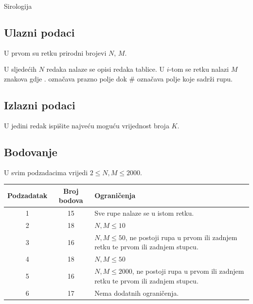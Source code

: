 \begin{statement}[
  problempoints=100,
  timelimit=1 sekunda,
  memorylimit=1024 MiB,
]{Sirologija}
\begin{figure}[!h]
\begin{subfigure}{0.49\linewidth}
    \end{subfigure}

  \end{figure}

\subsection*{Ulazni podaci}

U prvom su retku prirodni brojevi $N$, $M$.

U sljedećih $N$ redaka nalaze se opisi redaka tablice. U $i$-tom se retku nalazi $M$ znakova gdje $\texttt{.}$ označava prazno polje dok $\texttt{\#}$ označava polje koje sadrži rupu. 

\subsection*{Izlazni podaci}

U jedini redak ispišite najveću moguću vrijednost broja $K$.

\subsection*{Bodovanje}

U svim podzadacima vrijedi $2 \leq N, M \leq 2000$.

{\renewcommand{\arraystretch}{1.4}
  \setlength{\tabcolsep}{6pt}
  \begin{tabular}{ccl}
   Podzadatak & Broj bodova & Ograničenja \\ \midrule
    1 & 15 & Sve rupe nalaze se u istom retku. \\
    2 & 18 & $N, M \leq 10$ \\
    3 & 16 & $N, M \leq 50$, ne postoji rupa u prvom ili zadnjem retku te prvom ili zadnjem stupcu.\\
    4 & 18 & $N, M \leq 50$ \\
    5 & 16 & $N, M \leq 2000$, ne postoji rupa u prvom ili zadnjem retku te prvom ili zadnjem stupcu.\\
    6 & 17 & Nema dodatnih ograničenja. \\
\end{tabular}}


\end{statement}
